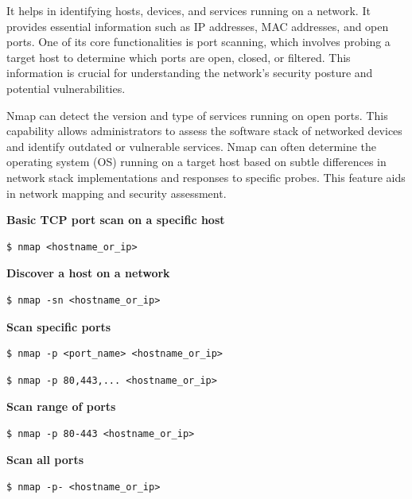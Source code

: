 \documentclass{article}
\newenvironment{codetemplate}[1][]{%
  \mybasecolorbox[#1]
  \itshape
}{%
  \endmybasecolorbox
}
\begin{document}
It helps in identifying hosts, devices, and services running on a network. It provides essential information such as IP addresses, MAC addresses, and open ports. One of its core functionalities is port scanning, which involves probing a target host to determine which ports are open, closed, or filtered. This information is crucial for understanding the network's security posture and potential vulnerabilities.

Nmap can detect the version and type of services running on open ports. This capability allows administrators to assess the software stack of networked devices and identify outdated or vulnerable services. Nmap can often determine the operating system (OS) running on a target host based on subtle differences in network stack implementations and responses to specific probes. This feature aids in network mapping and security assessment.

\textbf{Basic TCP port scan on a specific host}
\begin{codetemplate}{}
\begin{verbatim}
$ nmap <hostname_or_ip>
\end{verbatim}
\end{codetemplate}

\textbf{Discover a host on a network}
\begin{codetemplate}{}
\begin{verbatim}
$ nmap -sn <hostname_or_ip>
\end{verbatim}
\end{codetemplate}

\textbf{Scan specific ports}
\begin{codetemplate}{}
\begin{verbatim}
$ nmap -p <port_name> <hostname_or_ip>
\end{verbatim}
\end{codetemplate}
\begin{codetemplate}{}
\begin{verbatim}
$ nmap -p 80,443,... <hostname_or_ip>
\end{verbatim}
\end{codetemplate}

\textbf{Scan range of ports}
\begin{codetemplate}{}
\begin{verbatim}
$ nmap -p 80-443 <hostname_or_ip>
\end{verbatim}
\end{codetemplate}

\textbf{Scan all ports}
\begin{codetemplate}{}
\begin{verbatim}
$ nmap -p- <hostname_or_ip>
\end{verbatim}
\end{codetemplate}
\end{document}

